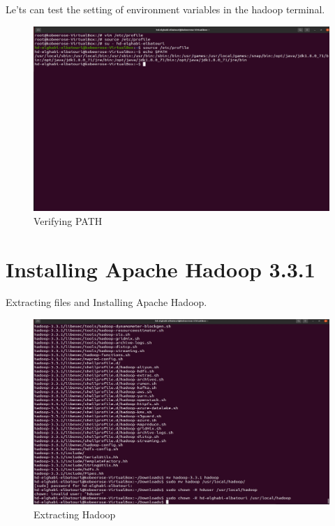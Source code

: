 \begin{spacing}{1.2}
\par Le'ts can test the setting of environment variables in the hadoop terminal.
\\
\begin{figure}[!htb] 
\begin{center} 
\includegraphics[width=1\linewidth]{Big_Data/Hadoop/Apache Hadoop Installation/Verifying PATH} 
\end{center} 
\caption{Verifying PATH} 
\end{figure} 
\FloatBarrier

\section{Installing Apache Hadoop 3.3.1}

\par Extracting files and Installing Apache Hadoop.
\\
\begin{figure}[!htb] 
\begin{center} 
\includegraphics[width=1\linewidth]{Big_Data/Hadoop/Apache Hadoop Installation/Extracting Hadoop}
\end{center} 
\caption{Extracting Hadoop} 
\end{figure} 
\FloatBarrier



\end{spacing}
